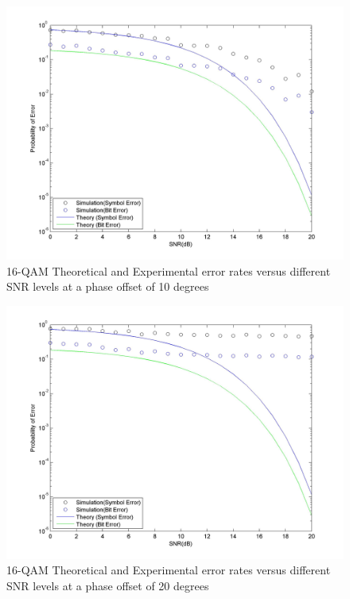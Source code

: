 \documentclass[]{article}
\begin{document}
\begin{figure}[H]
\centering
\hspace*{-2cm}\includegraphics[width=1.3\textwidth]{qam16SNRpo2.jpg}
\caption{16-QAM Theoretical and Experimental error rates versus different SNR levels at a phase offset of 10 degrees }
\end{figure}

\begin{figure}[H]
\centering
\hspace*{-2cm}\includegraphics[width=1.3\textwidth]{qam16SNRpo3.jpg}
\caption{16-QAM Theoretical and Experimental error rates versus different SNR levels at a phase offset of 20 degrees }
\end{figure}
\end{document}
